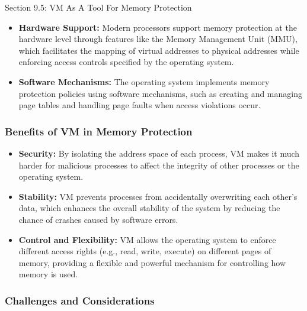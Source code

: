 \begin{notes}{Section 9.5: VM As A Tool For Memory Protection}
    \begin{itemize}
        \item \textbf{Hardware Support:} Modern processors support memory protection at the hardware level through features like the Memory Management Unit (MMU), which facilitates the mapping of 
        virtual addresses to physical addresses while enforcing access controls specified by the operating system.
        \item \textbf{Software Mechanisms:} The operating system implements memory protection policies using software mechanisms, such as creating and managing page tables and handling page faults 
        when access violations occur.
    \end{itemize}
    
    \subsubsection*{Benefits of VM in Memory Protection}
    
    \begin{itemize}
        \item \textbf{Security:} By isolating the address space of each process, VM makes it much harder for malicious processes to affect the integrity of other processes or the operating system.
        \item \textbf{Stability:} VM prevents processes from accidentally overwriting each other's data, which enhances the overall stability of the system by reducing the chance of crashes caused by software errors.
        \item \textbf{Control and Flexibility:} VM allows the operating system to enforce different access rights (e.g., read, write, execute) on different pages of memory, providing a flexible and 
        powerful mechanism for controlling how memory is used.
    \end{itemize}
    
    \subsubsection*{Challenges and Considerations}
    

\end{notes}
